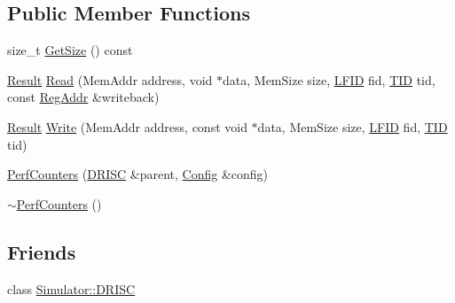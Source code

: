 \subsection*{Public Member Functions}
\begin{DoxyCompactItemize}
\item 
size\+\_\+t \hyperlink{class_simulator_1_1drisc_1_1_perf_counters_a04d8d06c22498a428c9731092c669611}{Get\+Size} () const 
\item 
\hyperlink{namespace_simulator_a4b6b5616e7236c0c131516a441776805}{Result} \hyperlink{class_simulator_1_1drisc_1_1_perf_counters_af7a3b0e6ccb8fe2f61974f9c5a55c6c3}{Read} (Mem\+Addr address, void $\ast$data, Mem\+Size size, \hyperlink{namespace_simulator_aaccbc706b2d6c99085f52f6dfc2333e4}{L\+F\+I\+D} fid, \hyperlink{namespace_simulator_a483cc4ecee1736e895054617672cded5}{T\+I\+D} tid, const \hyperlink{struct_simulator_1_1_reg_addr}{Reg\+Addr} \&writeback)
\item 
\hyperlink{namespace_simulator_a4b6b5616e7236c0c131516a441776805}{Result} \hyperlink{class_simulator_1_1drisc_1_1_perf_counters_ab99dac8f3343e17eb960ecf478974ad9}{Write} (Mem\+Addr address, const void $\ast$data, Mem\+Size size, \hyperlink{namespace_simulator_aaccbc706b2d6c99085f52f6dfc2333e4}{L\+F\+I\+D} fid, \hyperlink{namespace_simulator_a483cc4ecee1736e895054617672cded5}{T\+I\+D} tid)
\item 
\hyperlink{class_simulator_1_1drisc_1_1_perf_counters_a3c20ea5280c13f6723d55c7a149b6320}{Perf\+Counters} (\hyperlink{class_simulator_1_1_d_r_i_s_c}{D\+R\+I\+S\+C} \&parent, \hyperlink{class_config}{Config} \&config)
\item 
\hyperlink{class_simulator_1_1drisc_1_1_perf_counters_ae4dc2d954e25733d21cbbb68222299b4}{$\sim$\+Perf\+Counters} ()
\end{DoxyCompactItemize}
\subsection*{Friends}
\begin{DoxyCompactItemize}
\item 
class \hyperlink{class_simulator_1_1drisc_1_1_perf_counters_a14f94eb83e17d9d8841f39b37431d673}{Simulator\+::\+D\+R\+I\+S\+C}
\end{DoxyCompactItemize}


